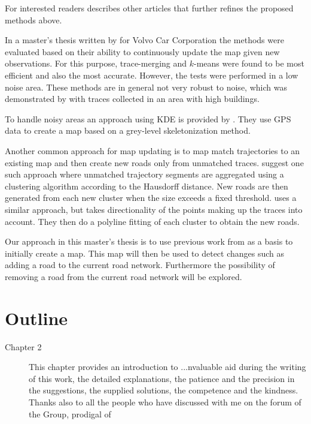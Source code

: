 For interested readers \cite{4inBiagioni} describes other articles that further refines the proposed methods above. 

In a master's thesis written by \cite{chalmers} for Volvo Car Corporation the methods were evaluated based on their ability to continuously update the map given new observations. For this purpose, trace-merging and $k$-means were found to be most efficient and also the most accurate. However, the tests were performed in a low noise area. These methods are in general not very robust to noise, which was demonstrated by \cite{biagioni:gis12} with traces collected in an area with high buildings.

To handle noisy areas an approach using \ac{KDE} is provided by \cite{biagioni:gis12}. They use \ac{GPS} data to create a map based on a grey-level skeletonization method. 

Another common approach for map updating is to map match trajectories to an existing map and then create new roads only from unmatched traces. \cite{crowdatlas} suggest one such approach where unmatched trajectory segments are aggregated using a clustering algorithm according to the Hausdorff distance. New roads are then generated from each new cluster when the size exceeds a fixed threshold. \cite{glue} uses a similar approach, but takes directionality of the points making up the traces into account. They then do a polyline fitting of each cluster to obtain the new roads.

Our approach in this master's thesis is to use previous work from \cite{biagioni:gis12} as a basis to initially create a map. This map will then be used to detect changes such as adding a road to the current road network. Furthermore the possibility of removing a road from the current road network will be explored.



\section{Outline}

\begin{description}
    \item[Chapter 2] This chapter provides an introduction to ...nvaluable aid during the writing of this work, the detailed explanations, the patience and the precision in the suggestions, the supplied solutions, the competence and the kindness. Thanks also to all the people who have discussed with me on the forum of the Group, prodigal of 
\end{description}


